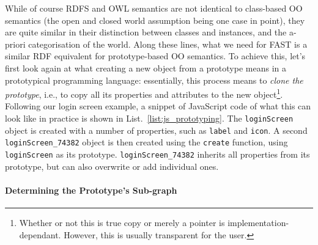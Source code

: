 \documentclass{article}
\begin{document}
While of course RDFS and OWL semantics are not identical to class-based OO semantics (the open and closed world assumption being one case in point), they are quite similar in their distinction between classes and instances, and the a-priori categorisation of the world. Along these lines, what we need for FAST is a similar RDF equivalent for prototype-based OO semantics. To achieve this, let's first look again at what creating a new object from a prototype means in a prototypical programming language: essentially, this process means to \emph{clone the prototype}, i.e., to copy all its properties and attributes to the new object\footnote{Whether or not this is true copy or merely a pointer is implementation-dependant. However, this is usually transparent for the user.}. Following our login screen example, a snippet of JavaScript code of what this can look like in practice is shown in List.~\ref{list:js_prototyping}. The \texttt{loginScreen} object is created with a number of properties, such as \texttt{label} and \texttt{icon}. A second \texttt{loginScreen\_74382} object is then created using the \texttt{create} function, using \texttt{loginScreen} as its prototype. \texttt{loginScreen\_74382} inherits all properties from its prototype, but can also overwrite or add individual ones.

\singlespacing
{}
\begin{figure}
	
\end{figure}
\doublespacing

\paragraph{Determining the Prototype's Sub-graph} %
\label{par:determining_the_correct_sub_graph}
\end{document}
